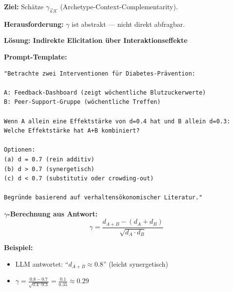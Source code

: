 \begin{tcolorbox}[colback=gray!5!white, colframe=gray!75!black,
    title=\textbf{Protokoll HHH-LLMMC-2: Komplementaritäts-Schätzung}]

\textbf{Ziel:} Schätze $\gamma_{\vec{a}\mathcal{K}}$ (Archetype-Context-Complementarity).

\textbf{Herausforderung:} $\gamma$ ist abstrakt --- nicht direkt abfragbar.

\textbf{Lösung: Indirekte Elicitation über Interaktionseffekte}

\medskip
\textbf{Prompt-Template:}
\begin{verbatim}
"Betrachte zwei Interventionen für Diabetes-Prävention:

A: Feedback-Dashboard (zeigt wöchentliche Blutzuckerwerte)
B: Peer-Support-Gruppe (wöchentliche Treffen)

Wenn A allein eine Effektstärke von d=0.4 hat und B allein d=0.3:
Welche Effektstärke hat A+B kombiniert?

Optionen:
(a) d = 0.7 (rein additiv)
(b) d > 0.7 (synergetisch)
(c) d < 0.7 (substitutiv oder crowding-out)

Begründe basierend auf verhaltensökonomischer Literatur."
\end{verbatim}

\textbf{$\gamma$-Berechnung aus Antwort:}
\begin{equation}
\gamma = \frac{d_{A+B} - (d_A + d_B)}{\sqrt{d_A \cdot d_B}}
\end{equation}

\textbf{Beispiel:}
\begin{itemize}[nosep]
    \item LLM antwortet: ``$d_{A+B} \approx 0.8$'' (leicht synergetisch)
    \item $\gamma = \frac{0.8 - 0.7}{\sqrt{0.4 \cdot 0.3}} = \frac{0.1}{0.35} \approx 0.29$
\end{itemize}

\end{tcolorbox}

